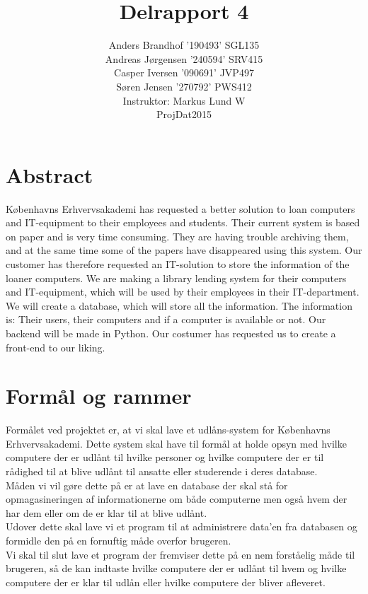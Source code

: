 \documentclass[a4paper]{article}
\title{Delrapport 4}
\author{Anders Brandhof '190493' SGL135 \\ Andreas Jørgensen '240594' SRV415 \\ Casper Iversen '090691' JVP497 \\ Søren Jensen '270792' PWS412 \\
Instruktor: Markus Lund W\\
ProjDat2015}
\begin{document}
\maketitle

\pagebreak

\tableofcontents

\newpage

\section{Abstract}
Københavns Erhvervsakademi has requested a better solution to loan computers and IT-equipment to their employees and students. Their current system is based on paper and is very time consuming. They are having trouble archiving them, and at the same time some of the papers have disappeared using this system. Our customer has therefore requested an IT-solution to store the information of the loaner computers. We are making a library lending system for their computers and IT-equipment, which will be used by their employees in their IT-department. We will create a database, which will store all the information. The information is: Their users, their computers and if a computer is available or not. Our backend will be made in Python. Our costumer has requested us to create a front-end to our liking.
\pagebreak
\section{Formål og rammer}
Formålet ved projektet er, at vi skal lave et udlåns-system for Københavns Erhvervsakademi. Dette system skal have til formål at holde opsyn med hvilke computere der er udlånt til hvilke personer og hvilke computere der er til rådighed til at blive udlånt til ansatte eller studerende i deres database.\\
Måden vi vil gøre dette på er at lave en database der skal stå for opmagasineringen af informationerne om både computerne men også hvem der har dem eller om de er klar til at blive udlånt.\\
Udover dette skal lave vi et program til at administrere data’en fra databasen og formidle den på en fornuftig måde overfor brugeren.\\
Vi skal til slut lave et program der fremviser dette på en nem forståelig måde til brugeren, så de kan indtaste hvilke computere der er udlånt til hvem og hvilke computere der er klar til udlån eller hvilke computere der bliver afleveret.\\ \\
\end{document}
